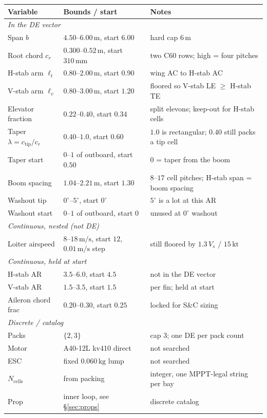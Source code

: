\documentclass[11pt,letterpaper]{article}
\begin{document}
\begin{center}
\begin{tabular}{@{}lll@{}}
\toprule
Variable & Bounds / start & Notes \\
\midrule
\multicolumn{3}{l}{\emph{In the DE vector}} \\
Span $b$ & $4.50$--$6.00\,\mathrm{m}$, start $6.00$ & hard cap $6\,\mathrm{m}$ \\
Root chord $c_r$ & $0.300$--$0.52\,\mathrm{m}$, start $310\,\mathrm{mm}$ & two C60 rows; high = four pitches \\
H-stab arm $\ell_t$ & $0.80$--$2.00\,\mathrm{m}$, start $0.90$ & wing AC to H-stab AC \\
V-stab arm $\ell_v$ & $0.80$--$3.00\,\mathrm{m}$, start $1.20$ & floored so V-stab LE $\ge$ H-stab TE \\
Elevator fraction & $0.22$--$0.40$, start $0.34$ & split elevons; keep-out for H-stab cells \\
Taper $\lambda = c_\mathrm{tip}/c_r$ & $0.40$--$1.0$, start $0.60$ & $1.0$ is rectangular; $0.40$ still packs a tip cell \\
Taper start & $0$--$1$ of outboard, start $0.50$ & $0$ = taper from the boom \\
Boom spacing & $1.04$--$2.21\,\mathrm{m}$, start $1.30$ & $8$--$17$ cell pitches; H-stab span = boom spacing \\
Washout tip & $0^\circ$--$5^\circ$, start $0^\circ$ & $5^\circ$ is a lot at this AR \\
Washout start & $0$--$1$ of outboard, start $0$ & unused at $0^\circ$ washout \\
\midrule
\multicolumn{3}{l}{\emph{Continuous, nested (not DE)}} \\
Loiter airspeed & $8$--$18\,\mathrm{m/s}$, start $12$, $0.01\,\mathrm{m/s}$ step & still floored by $1.3\,V_s$ / $15\,\mathrm{kt}$ \\
\midrule
\multicolumn{3}{l}{\emph{Continuous, held at start}} \\
H-stab AR & $3.5$--$6.0$, start $4.5$ & not in the DE vector \\
V-stab AR & $1.5$--$3.5$, start $1.5$ & per fin; held at start \\
Aileron chord frac & $0.20$--$0.30$, start $0.25$ & locked for S\&C sizing \\
\midrule
\multicolumn{3}{l}{\emph{Discrete / catalog}} \\
Packs & $\{2,3\}$ & cap 3; one DE per pack count \\
Motor & A40-12L kv410 direct & not searched \\
ESC & fixed $0.060\,\mathrm{kg}$ lump & not searched \\
$N_\mathrm{cells}$ & from packing & integer, one MPPT-legal string per bay \\
Prop & inner loop, see \S\ref{sec:props} & discrete catalog \\
\bottomrule
\end{tabular}
\end{center}
\end{document}
